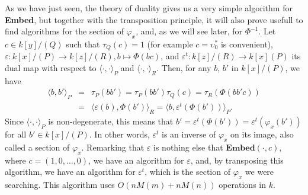 \documentclass[a4paper,11pt]{article}
\theoremstyle{break}
\theoremstyle{definition}
\theoremstyle{remark}
\newcommand{\ps}[2]{\langle#1,#2\rangle}
\newcommand{\psdot}{\ps{\cdot}{\cdot}}
\begin{document}
As we have just seen, the theory of duality gives us a very simple algorithm for
\textbf{Embed}, but together with the transposition principle, it will also
prove usefull to find algorithms for the section of $\varphi_x$, and, as we will
see later, for $\Phi^{-1}$. Let $c\in k[y]/(Q)$ such that $\tau_Q(c)=1$ (for
example $c=\upsilon^*_0$ is convenient), $\varepsilon:k[x]/(P)\to k[z]/(R),
b\mapsto \Phi(bc)$, and $\varepsilon^t:k[z]/(R)\to k[x](P)$ its dual map with
respect to $\psdot_P$ and $\psdot_R$. Then, for any $b$, $b'$ in $k[x]/(P)$, we
have
\[
\begin{array}{rcl}
  \ps{b}{b'}_P &=& \tau_P(bb') = \tau_P(bb')\tau_Q(c) = \tau_R(\Phi(bb'c))\\
  &=& \ps{\varepsilon(b)}{\Phi(b')}_R = \ps{b}{\varepsilon^t(\Phi(b'))}_P.
\end{array}
\]
Since $\psdot_P$ is non-degenerate, this means that 
$b'=\varepsilon^t(\Phi(b'))=\varepsilon^t(\varphi_x(b'))$ for all $b'\in 
k[x]/(P)$. In other words, $\varepsilon^t$ is an inverse of $\varphi_x$ on its 
image, also called a section of $\varphi_x$. Remarking that $\varepsilon$ is 
nothing else that $\textbf{Embed}(\cdot,c)$, where $c=(1,0,\dots,0)$, we have 
an algorithm for $\varepsilon$, and, by transposing this algorithm, we have an 
algorithm for $\varepsilon^t$, which is the section of $\varphi_x$ we were 
searching. This algorithm uses $O(nM(m)+nM(n))$ operations in $k$.
\end{document}
